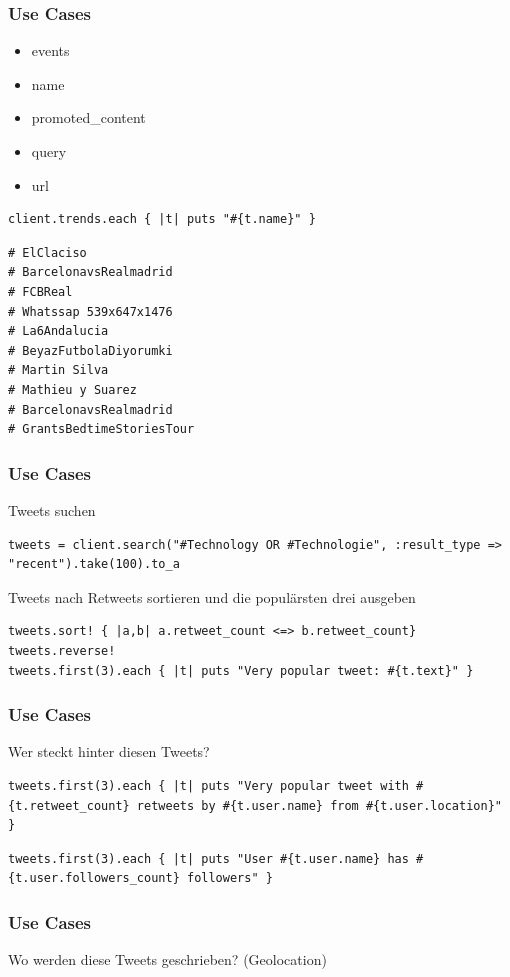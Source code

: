 \documentclass{beamer}
\begin{document}
\begin{frame}[fragile]
  \frametitle{Use Cases}
  \begin{itemize}
    \item events
    \item name
    \item promoted\_content
    \item query
    \item url
  \end{itemize}\pause
  \begin{lstlisting}
client.trends.each { |t| puts "#{t.name}" }   
  \end{lstlisting}\pause
  \begin{lstlisting}
# ElClaciso
# BarcelonavsRealmadrid
# FCBReal
# Whatssap 539x647x1476
# La6Andalucia
# BeyazFutbolaDiyorumki
# Martin Silva
# Mathieu y Suarez
# BarcelonavsRealmadrid
# GrantsBedtimeStoriesTour
  \end{lstlisting}
\end{frame}

\begin{frame}[fragile]
  \frametitle{Use Cases}
  Tweets suchen\pause
  \begin{lstlisting}
tweets = client.search("#Technology OR #Technologie", :result_type => "recent").take(100).to_a
  \end{lstlisting}\pause
  Tweets nach Retweets sortieren und die populärsten drei ausgeben\pause
  \begin{lstlisting}
tweets.sort! { |a,b| a.retweet_count <=> b.retweet_count}
tweets.reverse!
tweets.first(3).each { |t| puts "Very popular tweet: #{t.text}" }    
  \end{lstlisting}
\end{frame}

\begin{frame}[fragile]
  \frametitle{Use Cases}
Wer steckt hinter diesen Tweets?\pause
  \begin{lstlisting}
tweets.first(3).each { |t| puts "Very popular tweet with #{t.retweet_count} retweets by #{t.user.name} from #{t.user.location}" }
  \end{lstlisting}\pause
  \begin{lstlisting}
tweets.first(3).each { |t| puts "User #{t.user.name} has #{t.user.followers_count} followers" }
  \end{lstlisting}
\end{frame}

\begin{frame}[fragile]
  \frametitle{Use Cases}
  Wo werden diese Tweets geschrieben? (Geolocation)
  \begin{lstlisting}
    
  \end{lstlisting}
\end{frame}
\end{document}
